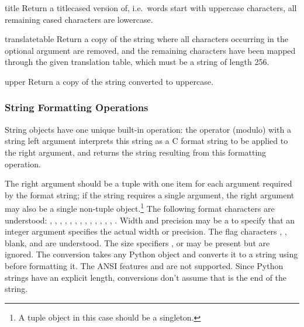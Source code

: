 \begin{methoddesc}[string]{title}{}
Return a titlecased version of, i.e.\ words start with uppercase
characters, all remaining cased characters are lowercase.
\end{methoddesc}

\begin{methoddesc}[string]{translate}{table}
Return a copy of the string where all characters occurring in the
optional argument  are removed, and the remaining
characters have been mapped through the given translation table, which
must be a string of length 256.
\end{methoddesc}

\begin{methoddesc}[string]{upper}{}
Return a copy of the string converted to uppercase.
\end{methoddesc}


\subsubsection{String Formatting Operations \label{typesseq-strings}}


String objects have one unique built-in operation: the \code{\%}
operator (modulo) with a string left argument interprets this string
as a C  format string to be applied to the
right argument, and returns the string resulting from this formatting
operation.

The right argument should be a tuple with one item for each argument
required by the format string; if the string requires a single
argument, the right argument may also be a single non-tuple
object.\footnote{A tuple object in this case should be a singleton.
}  The following format characters are understood:
\code{\%}, , , , , , ,
, , , , , , . 
Width and precision may be a \code{*} to specify that an integer argument
specifies the actual width or precision.  The flag characters
\code{-}, \code{+}, blank, \code{\#} and  are understood.  The 
size specifiers ,  or  may be present but are
ignored.  The  conversion takes any Python object and
converts it to a string using  before formatting it.  The
ANSI features  and  are not supported.  Since
Python strings have an explicit length,  conversions don't
assume that  is the end of the string.

